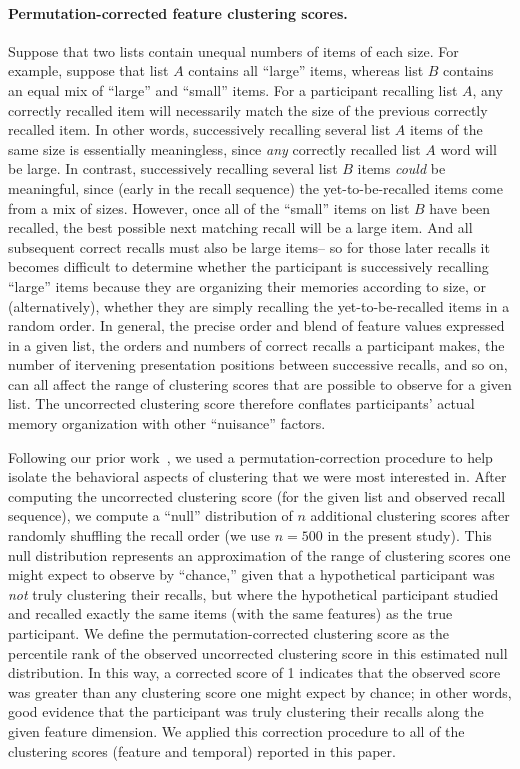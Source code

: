 \documentclass[11pt]{article}
\begin{document}
\paragraph*{Permutation-corrected feature clustering scores.}

Suppose that two lists contain unequal numbers of items of each size. For
example, suppose that list $A$ contains all ``large'' items, whereas list $B$
contains an equal mix of ``large'' and ``small'' items. For a participant
recalling list $A$, any correctly recalled item will necessarily match the size
of the previous correctly recalled item. In other words, successively recalling
several list $A$ items of the same size is essentially meaningless, since
\textit{any} correctly recalled list $A$ word will be large. In contrast,
successively recalling several list $B$ items \textit{could} be meaningful,
since (early in the recall sequence) the yet-to-be-recalled items come from a
mix of sizes. However, once all of the ``small'' items on list $B$ have been
recalled, the best possible next matching recall will be a large item. And all
subsequent correct recalls must also be large items-- so for those later
recalls it becomes difficult to determine whether the participant is
successively recalling ``large'' items because they are organizing their
memories according to size, or (alternatively), whether they are simply
recalling the yet-to-be-recalled items in a random order. In general, the
precise order and blend of feature values expressed in a given list, the orders
and numbers of correct recalls a participant makes, the number of itervening
presentation positions between successive recalls, and so on, can all affect
the range of clustering scores that are possible to observe for a given list.
The uncorrected clustering score therefore conflates participants' actual
memory organization with other ``nuisance'' factors.

Following our prior work~\citep{HeusEtal17}, we used a permutation-correction
procedure to help isolate the behavioral aspects of clustering that we were
most interested in. After computing the uncorrected clustering score (for the
given list and observed recall sequence), we compute a ``null'' distribution of
$n$ additional clustering scores after randomly shuffling the recall order (we
use $n = 500$ in the present study). This null distribution represents an
approximation of the range of clustering scores one might expect to observe by
``chance,'' given that a hypothetical participant was \textit{not} truly
clustering their recalls, but where the hypothetical participant studied and
recalled exactly the same items (with the same features) as the true
participant. We define the permutation-corrected clustering score as the
percentile rank of the observed uncorrected clustering score in this estimated
null distribution. In this way, a corrected score of 1 indicates that the
observed score was greater than any clustering score one might expect by
chance; in other words, good evidence that the participant was truly clustering
their recalls along the given feature dimension.  We applied this correction procedure
to all of the clustering scores (feature and temporal) reported in this paper.
\end{document}

